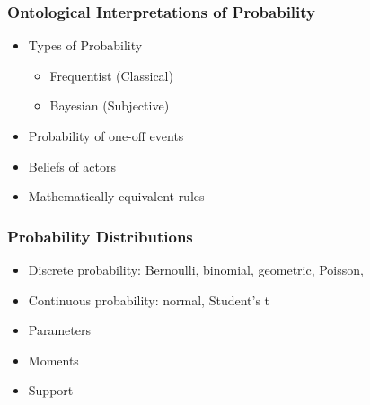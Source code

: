 \documentclass{beamer}
\begin{document}
\begin{frame}
  \frametitle{Ontological Interpretations of Probability}
  
  
  \begin{itemize}
  \item Types of Probability
    \begin{itemize}
    \item Frequentist (Classical)
    \item Bayesian (Subjective)
    \end{itemize}
  \item Probability of one-off events
  \item Beliefs of actors
  \item Mathematically equivalent rules
  \end{itemize}

\end{frame}


\begin{frame}
  \frametitle{Probability Distributions}

  \begin{itemize}
  \item Discrete probability: Bernoulli, binomial, geometric, Poisson, 
  \item Continuous probability: normal, Student's t
  \item Parameters
  \item Moments
  \item Support
  \end{itemize}

\end{frame}
\end{document}
